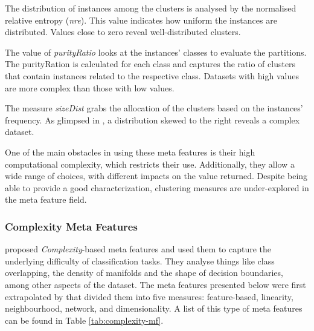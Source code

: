 The distribution of instances among the clusters is analysed by the normalised relative entropy (\textit{nre}). This value indicates how uniform the instances are distributed. Values close to zero reveal well-distributed clusters.

The value of \textit{purityRatio} looks at the instances’ classes to evaluate the partitions. The purityRation is calculated for each class and captures the ratio of clusters that contain instances related to the respective class. Datasets with high values are more complex than those with low values.

The measure \textit{sizeDist} grabs the allocation of the clusters based on the instances’ frequency. As glimpsed in \cite{ler2018algorithm}, a distribution skewed to the right reveals a complex dataset.

One of the main obstacles in using these meta features is their high computational complexity, which restricts their use. Additionally, they allow a wide range of choices, with different impacts on the value returned. Despite being able to provide a good characterization, clustering measures are under-explored in the meta feature field.

\subsubsection{Complexity Meta Features}

\cite{ho2002complexity} proposed \textit{Complexity}-based meta features and used them to capture the underlying difficulty of classification tasks. They analyse things like class overlapping, the density of manifolds and the shape of decision boundaries, among other aspects of the dataset. The meta features presented below were first extrapolated by \cite{rivolli2022meta} that divided them into five measures: feature-based, linearity, neighbourhood, network, and dimensionality. A list of this type of meta features can be found in Table \ref{tab:complexity-mf}.

